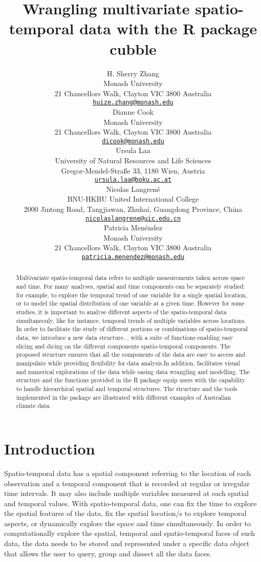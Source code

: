 \documentclass{article}
\title{Wrangling multivariate spatio-temporal data with the R package cubble}
\author{
    H. Sherry Zhang
   \\
    Monash University \\
  21 Chancellors Walk, Clayton VIC 3800 Australia \\
  \texttt{\href{mailto:huize.zhang@monash.edu}{\nolinkurl{huize.zhang@monash.edu}}} \\
   \And
    Dianne Cook
   \\
    Monash University \\
  21 Chancellors Walk, Clayton VIC 3800 Australia \\
  \texttt{\href{mailto:dicook@monash.edu}{\nolinkurl{dicook@monash.edu}}} \\
   \And
    Ursula Laa
   \\
    University of Natural Resources and Life Sciences \\
  Gregor-Mendel-Straße 33, 1180 Wien, Austria \\
  \texttt{\href{mailto:ursula.laa@boku.ac.at}{\nolinkurl{ursula.laa@boku.ac.at}}} \\
   \And
    Nicolas Langrené
   \\
    BNU-HKBU United International College \\
  2000 Jintong Road, Tangjiawan, Zhuhai, Guangdong Province, China \\
  \texttt{\href{mailto:nicolaslangrene@uic.edu.cn}{\nolinkurl{nicolaslangrene@uic.edu.cn}}} \\
   \And
    Patricia Menéndez
   \\
    Monash University \\
  21 Chancellors Walk, Clayton VIC 3800 Australia \\
  \texttt{\href{mailto:patricia.menendez@monash.edu}{\nolinkurl{patricia.menendez@monash.edu}}} \\
  }
\begin{document}
\maketitle


\begin{abstract}
Multivariate spatio-temporal data refers to multiple measurements taken across space and time. For many analyses, spatial and time components can be separately studied: for example, to explore the temporal trend of one variable for a single spatial location, or to model the spatial distribution of one variable at a given time. However for some studies, it is important to analyse different aspects of the spatio-temporal data simultaneouly, like for instance, temporal trends of multiple variables across locations. In order to facilitate the study of different portions or combinations of spatio-temporal data, we introduce a new data structure, , with a suite of functions enabling easy slicing and dicing on the different components spatio-temporal components. The proposed  structure ensures that all the components of the data are easy to access and manipulate while providing flexibility for data analysis.In addition,  facilitates visual and numerical explorations of the data while easing data wrangling and modelling. The  structure and the functions provided in the  R package equip users with the capability to handle hierarchical spatial and temporal structures. The  structure and the tools implemented in the package are illustrated with different examples of Australian climate data.
\end{abstract}


\newpage

\hypertarget{introduction}{%
\section{Introduction}\label{introduction}}

Spatio-temporal data has a spatial component referring to the location of each observation and a temporal component that is recorded at regular or irregular time intervals. It may also include multiple variables measured at each spatial and temporal values. With spatio-temporal data, one can fix the time to explore the spatial features of the data, fix the spatial location/s to explore temporal aspects, or dynamically explore the space and time simultaneously.
In order to computationally explore the spatial, temporal and spatio-temporal faces of such data, the data needs to be stored and represented under a specific data object that allows the user to query, group and dissect all the data faces.
\end{document}
